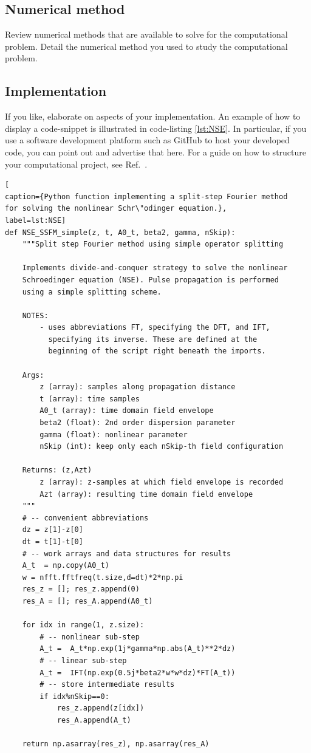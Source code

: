 \subsection{Numerical method}
Review numerical methods that are available to solve for the computational
problem.  Detail the numerical method you used to study the computational
problem.

\subsection{Implementation}
If you like, elaborate on aspects of your implementation. An example of how to
display a code-snippet is illustrated in code-listing \ref{lst:NSE}. In
particular, if you use a software development platform such as GitHub to host
your developed code, you can point out and advertise that here.
For a guide on how to structure your computational project, see Ref.~\cite{Noble:PLOS:2009}.

\begin{lstlisting}[
caption={Python function implementing a split-step Fourier method 
for solving the nonlinear Schr\"odinger equation.}, 
label=lst:NSE]
def NSE_SSFM_simple(z, t, A0_t, beta2, gamma, nSkip):
    """Split step Fourier method using simple operator splitting

    Implements divide-and-conquer strategy to solve the nonlinear
    Schroedinger equation (NSE). Pulse propagation is performed
    using a simple splitting scheme.

    NOTES:
        - uses abbreviations FT, specifying the DFT, and IFT, 
          specifying its inverse. These are defined at the 
          beginning of the script right beneath the imports.

    Args:
        z (array): samples along propagation distance
        t (array): time samples
        A0_t (array): time domain field envelope
        beta2 (float): 2nd order dispersion parameter
        gamma (float): nonlinear parameter
        nSkip (int): keep only each nSkip-th field configuration

    Returns: (z,Azt)
        z (array): z-samples at which field envelope is recorded
        Azt (array): resulting time domain field envelope
    """
    # -- convenient abbreviations
    dz = z[1]-z[0]
    dt = t[1]-t[0]
    # -- work arrays and data structures for results
    A_t  = np.copy(A0_t)
    w = nfft.fftfreq(t.size,d=dt)*2*np.pi
    res_z = []; res_z.append(0)
    res_A = []; res_A.append(A0_t)

    for idx in range(1, z.size):
        # -- nonlinear sub-step
        A_t =  A_t*np.exp(1j*gamma*np.abs(A_t)**2*dz)
        # -- linear sub-step
        A_t =  IFT(np.exp(0.5j*beta2*w*w*dz)*FT(A_t))
        # -- store intermediate results
        if idx%nSkip==0:
            res_z.append(z[idx])
            res_A.append(A_t)

    return np.asarray(res_z), np.asarray(res_A)
\end{lstlisting}



